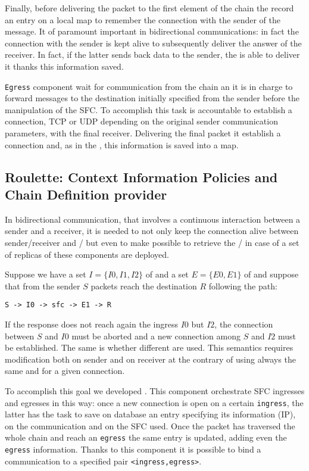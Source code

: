 Finally, before delivering the packet to the first element of the chain the
\ingress{} record an entry on a local map to remember the connection with
the sender of the message. It of paramount important in bidirectional
communications: in fact the connection with the sender is kept alive to
subsequently deliver the answer of the receiver. In fact, if the latter sends
back data to the sender, the \ingress{} is able to deliver it thanks this
information saved.

\texttt{Egress} component wait for communication from the chain an it is in
charge to forward messages to the destination initially specified from the
sender before the manipulation of the SFC. To accomplish this task is
accountable to establish a connection, TCP or UDP depending on the original
sender communication parameters, with the final receiver. Delivering the final
packet it establish a connection and, as in the \ingress{}, this information is
saved into a map. 

\subsection{Roulette: Context Information Policies and Chain Definition
provider}
In bidirectional communication, that involves a continuous interaction between a
sender and a receiver, it is needed to not only keep the connection alive
between sender/receiver and \ingress{}/\egress{} but even to make possible to
retrieve the \ingress{}/\egress{} in case of a set of replicas of these
components are deployed.

\begin{exmp}
Suppose we have a set $I=\{I0, I1, I2\}$ of \ingresses{} and a set $E=\{E0,
E1\}$ of \egresses{} and suppose that from the sender $S$ packets reach the
destination $R$ following the path:
\begin{verbatim}
S -> I0 -> sfc -> E1 -> R
\end{verbatim}
If the response does not reach again the ingress $I0$ but $I2$, the connection
between $S$ and $I0$ must be aborted and a new connection among $S$ and $I2$
must be established. The same is whether different \egresses{} are used. This
semantics requires modification both on sender and on receiver at the
contrary of using always the same \ingress{} and \egress{} for a given
connection.
\end{exmp}

To accomplish this goal we developed \roulette{}. This component orchestrate SFC
ingresses and egresses in this way: once a new connection is open on a certain 
\texttt{ingress}, the latter has the task to save on \roulette{} database an
entry specifying its information (IP), on the communication and on the SFC used.
Once the packet has traversed the whole chain and reach an \texttt{egress} the
same entry is updated, adding even the \texttt{egress} information. Thanks to
this component it is possible to bind a communication to a specified pair 
\verb!<ingress,egress>!.

